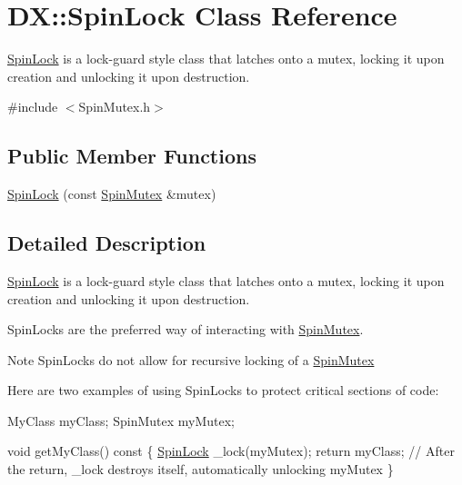 \hypertarget{class_d_x_1_1_spin_lock}{\section{D\-X\-:\-:Spin\-Lock Class Reference}
\label{class_d_x_1_1_spin_lock}
}


\hyperlink{class_d_x_1_1_spin_lock}{Spin\-Lock} is a lock-\/guard style class that latches onto a mutex, locking it upon creation and unlocking it upon destruction.  




{\ttfamily \#include $<$Spin\-Mutex.\-h$>$}

\subsection*{Public Member Functions}
\begin{DoxyCompactItemize}
\item 
\hyperlink{class_d_x_1_1_spin_lock_a338ff0b08d3517e734fbf190bfff7e24}{Spin\-Lock} (const \hyperlink{class_d_x_1_1_spin_mutex}{Spin\-Mutex} \&mutex)
\end{DoxyCompactItemize}


\subsection{Detailed Description}
\hyperlink{class_d_x_1_1_spin_lock}{Spin\-Lock} is a lock-\/guard style class that latches onto a mutex, locking it upon creation and unlocking it upon destruction. 

Spin\-Locks are the preferred way of interacting with \hyperlink{class_d_x_1_1_spin_mutex}{Spin\-Mutex}.

\begin{DoxyNote}{Note}
Spin\-Locks do not allow for recursive locking of a \hyperlink{class_d_x_1_1_spin_mutex}{Spin\-Mutex}
\end{DoxyNote}
Here are two examples of using Spin\-Locks to protect critical sections of code\-: 
\begin{DoxyCode}
MyClass myClass;
SpinMutex myMutex;

\textcolor{keywordtype}{void} getMyClass()\textcolor{keyword}{ const}
\textcolor{keyword}{}\{
    \hyperlink{class_d_x_1_1_spin_lock_a338ff0b08d3517e734fbf190bfff7e24}{SpinLock} \_lock(myMutex);
    \textcolor{keywordflow}{return} myClass; \textcolor{comment}{// After the return, \_lock destroys itself, automatically unlocking myMutex}
\}
\end{DoxyCode}



